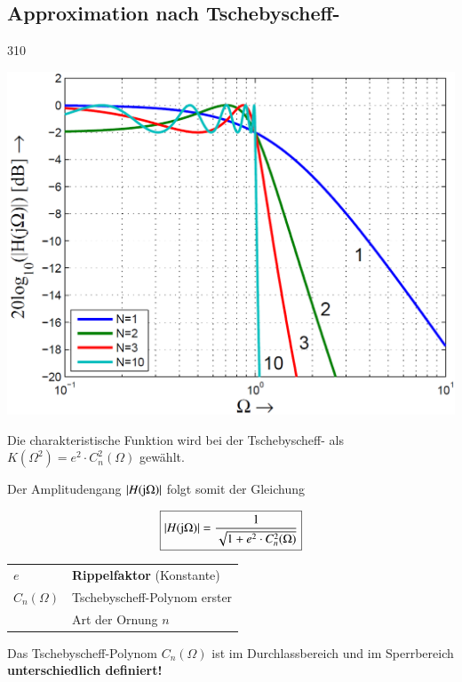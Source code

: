 \subsection{Approximation nach Tschebyscheff-}{310}

\begin{minipage}[c]{0.45\columnwidth}
    \includegraphics[width=\columnwidth]{images/filter_tschebyscheff_amplitudengang.png}
\end{minipage}
\hfill
\begin{minipage}[c]{0.48\columnwidth}
    Die charakteristische Funktion wird bei der Tschebyscheff- als\\
    $K(\Omega^2) = e^2 \cdot C_n^2(\Omega)$ gewählt.

    Der Amplitudengang $|H(\mathrm{j} \Omega)|$ folgt somit der Gleichung

    $$\boxed{ |H(\mathrm{j} \Omega)| = \frac{1}{\sqrt{1 + e^2 \cdot C_n^2(\Omega)} } } $$

    \begin{tabular}{ll@{}}
        $e$             & \textbf{Rippelfaktor} (Konstante) \\
        $C_n(\Omega)$   & Tschebyscheff-Polynom erster\\
                        & Art der Ornung $n$
    \end{tabular}
\end{minipage}

Das Tschebyscheff-Polynom $C_n(\Omega)$ ist im Durchlassbereich und im Sperrbereich \textbf{unterschiedlich definiert!}

